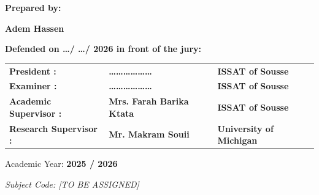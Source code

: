 \begin{titlepage}
\vspace{0.8cm}

\begin{flushleft}
    \textbf{Prepared by:}
\end{flushleft}
{\LARGE \textbf{Adem Hassen}}

\vspace{0.6cm}

\begin{center}
    \textbf{Defended on \hspace{0.5cm} \dots / \dots / 2026 \hspace{1cm} in front of the jury:}
\end{center}

\vspace{0.3cm}

\begin{center}
\small %
\renewcommand{\arraystretch}{1.3}
\begin{tabular}{@{}lll}
    \textbf{President :} & \textbf{\dots\dots\dots\dots\dots\dots} & \textbf{ISSAT of Sousse} \\
    \textbf{Examiner :} & \textbf{\dots\dots\dots\dots\dots\dots} & \textbf{ISSAT of Sousse} \\
    \textbf{Academic Supervisor :} & \textbf{Mrs. Farah Barika Ktata} & \textbf{ISSAT of Sousse} \\
    \textbf{Research Supervisor :} & \textbf{Mr. Makram Souii} & \textbf{University of Michigan} \\
\end{tabular}
\end{center}

\vfill

{\large Academic Year: \textbf{2025 / 2026}}

\vspace{0.2cm}
{\raggedleft\footnotesize\itshape Subject Code: [TO BE ASSIGNED]\par}

\end{titlepage}
\restoregeometry
